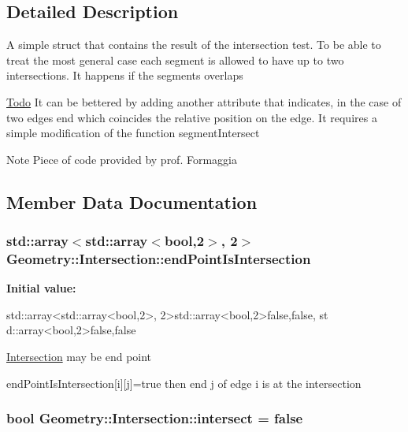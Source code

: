 \subsection{Detailed Description}
A simple struct that contains the result of the intersection test. To be able to treat the most general case each segment is allowed to have up to two intersections. It happens if the segments overlaps

\begin{Desc}
\item[\hyperlink{todo__todo000001}{Todo}]It can be bettered by adding another attribute that indicates, in the case of two edges end which coincides the relative position on the edge. It requires a simple modification of the function segmentIntersect \end{Desc}
\begin{DoxyNote}{Note}
Piece of code provided by prof. Formaggia 
\end{DoxyNote}


\subsection{Member Data Documentation}
\hypertarget{structGeometry_1_1Intersection_ac26994bdf89460be8b13c1304796b6bb}{
\subsubsection[{endPointIsIntersection}]{\setlength{\rightskip}{0pt plus 5cm}std::array$<$std::array$<$bool,2$>$, 2$>$ {\bf Geometry::Intersection::endPointIsIntersection}}}
\label{structGeometry_1_1Intersection_ac26994bdf89460be8b13c1304796b6bb}
{\bfseries Initial value:}
\begin{DoxyCode}

            std::array<std::array<bool,2>, 2>{std::array<bool,2>{false,false}, st
      d::array<bool,2>{false,false} }
\end{DoxyCode}
\hyperlink{structGeometry_1_1Intersection}{Intersection} may be end point

endPointIsIntersection\mbox{[}i\mbox{]}\mbox{[}j\mbox{]}=true then end j of edge i is at the intersection \hypertarget{structGeometry_1_1Intersection_a45563c77f618ad3a58931ed051032d45}{
\subsubsection[{intersect}]{\setlength{\rightskip}{0pt plus 5cm}bool {\bf Geometry::Intersection::intersect} = false}}
\label{structGeometry_1_1Intersection_a45563c77f618ad3a58931ed051032d45}


